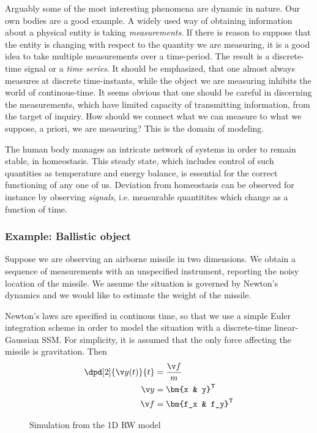 Arguably some of the most interesting phenomena are dynamic in nature. 
Our own bodies are a good example. A widely used way of obtaining information
about a physical entity is taking \emph{measurements}. If there is reason
to suppose that the entity is changing with respect to the quantity
we are measuring, it is a good idea to take multiple measurements over
a time-period. The result is a discrete-time signal or a \emph{time series}.
It should be emphasized, that one almost always measures at discrete time-instants,
while the object we are measuring inhibits the world of continous-time.
It seems obvious that one should be careful in discerning the measurements,
which have limited capacity of transmitting information, from the target of inquiry.
How should we connect what we can measure to what we suppose, a priori, we are
measuring? This is the domain of modeling.



The human body manages an intricate network of systems in order to remain
stable, in homeostasis. This steady state, which includes control of such quantities
as temperature and energy balance, is essential for the correct functioning of any one of us.
Deviation from homeostasis can be observed for instance by observing
\emph{signals}, i.e. measurable quantitites which change as a function of time.
 

\parencite{Murphy2002}
\subsubsection*{Example: Ballistic object}
Suppose we are observing an airborne missile in two dimensions.
We obtain a sequence of measurements with an unspecified instrument,
reporting the noisy location of the missile. We assume the situation
is governed by Newton's dynamics and we would like to estimate the weight
of the missile.

Newton's laws are specified in continous time, so that we use a simple
Euler integration scheme in order to model the situation with a discrete-time 
linear-Gaussian SSM. For simplicity, it is assumed that the only force affecting
the missile is gravitation. Then
\begin{align}
	\dpd[2]{\y(t)}{t} &= \frac{\f}{m}\\
	\y &= \bm{x & y}^\tr\\
	\f &= \bm{f_x & f_y}^\tr	
\end{align}

 
\begin{figure}[htp]
\begin{center}
  \caption{Simulation from the 1D RW model}
  \label{fig:rw1d}
\end{center}
\end{figure}
